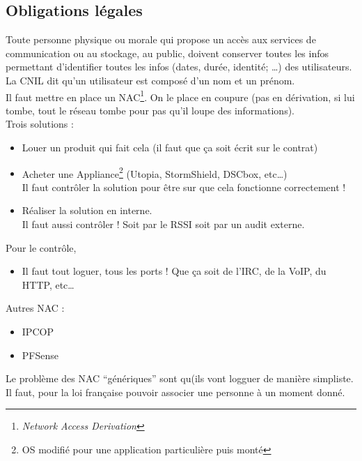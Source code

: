 \subsection{Obligations légales}
Toute personne physique ou morale qui propose un accès aux services de communication ou au stockage, au public, doivent conserver toutes les infos permettant d'identifier toutes les infos (dates, durée, identité; \ldots) des utilisateurs.\\
La CNIL dit qu'un utilisateur est composé d'un nom et un prénom.\\
Il faut mettre en place un NAC\footnote{\textit{Network Access Derivation}}. On le place en coupure (pas en dérivation, si lui tombe, tout le réseau tombe pour pas qu'il loupe des informations).\\
Trois solutions : 
\begin{itemize}
 \item Louer un produit qui fait cela (il faut que ça soit écrit sur le contrat)
 \item Acheter une Appliance\footnote{OS modifié pour une application particulière puis monté} (Utopia, StormShield, DSCbox, etc\ldots)\\Il faut contrôler la solution pour être sur que cela fonctionne correctement !
 \item Réaliser la solution en interne.\\Il faut aussi contrôler ! Soit par le RSSI soit par un audit externe.
\end{itemize}
Pour le contrôle, 
\begin{itemize}
  \item Il faut tout loguer, tous les ports ! Que ça soit de l'IRC, de la VoIP, du HTTP, etc\ldots
\end{itemize}
Autres NAC :
\begin{itemize}
 \item IPCOP
 \item PFSense
\end{itemize}
Le problème des NAC \enquote{génériques} sont qu(ils vont logguer de manière simpliste. Il faut, pour la loi française pouvoir associer une personne à un moment donné.